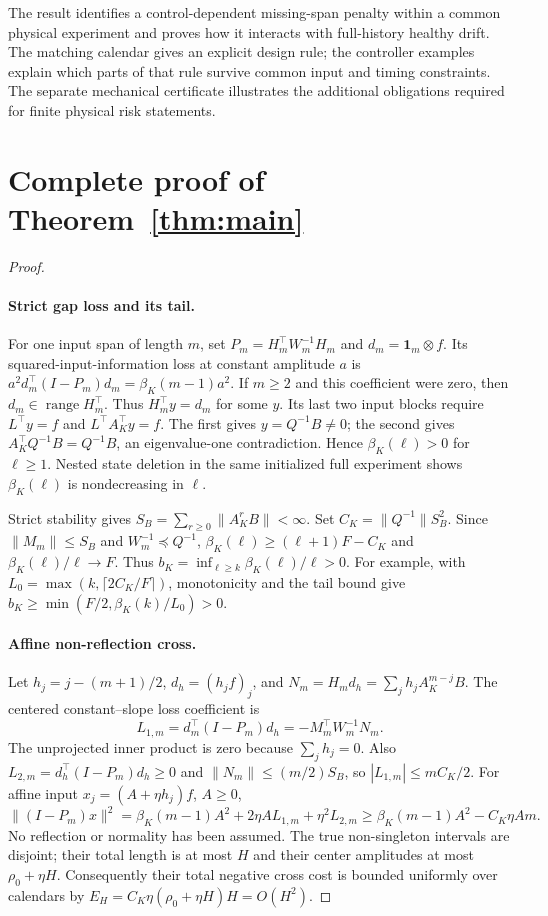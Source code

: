 \documentclass[11pt]{article}
\begin{document}
The result identifies a control-dependent missing-span penalty within a
common physical experiment and proves how it interacts with full-history
healthy drift. The matching calendar gives an explicit design rule; the
controller examples explain which parts of that rule survive common input
and timing constraints. The separate mechanical certificate illustrates the
additional obligations required for finite physical risk statements.

\appendix
\section{Complete proof of Theorem~\ref{thm:main}}\label{sec:proof}

\begin{proof}
\paragraph{Strict gap loss and its tail.}
For one input span of length $m$, set $P_m=H_m^\top W_m^{-1}H_m$ and
$d_m=\mathbf1_m\otimes f$.
Its squared-input-information loss at constant amplitude $a$ is
$a^2d_m^\top(I-P_m)d_m=\beta_K(m-1)a^2$.
If $m\ge2$ and this coefficient were zero, then $d_m\in\operatorname{range}H_m^\top$.
Thus $H_m^\top y=d_m$ for some $y$. Its last two input blocks require
$L^\top y=f$ and $L^\top A_K^\top y=f$.
The first gives $y=Q^{-1}B\ne0$; the second gives
$A_K^\top Q^{-1}B=Q^{-1}B$, an eigenvalue-one contradiction.
Hence $\beta_K(\ell)>0$ for $\ell\ge1$.
Nested state deletion in the same initialized full experiment shows
$\beta_K(\ell)$ is nondecreasing in $\ell$.

Strict stability gives
$S_B=\sum_{r\ge0}\|A_K^rB\|<\infty$.
Set $C_K=\|Q^{-1}\|S_B^2$.
Since $\|M_m\|\le S_B$ and $W_m^{-1}\preceq Q^{-1}$,
$\beta_K(\ell)\ge(\ell+1)F-C_K$ and $\beta_K(\ell)/\ell\to F$.
Thus $b_K=\inf_{\ell\ge k}\beta_K(\ell)/\ell>0$.
For example, with $L_0=\max(k,\lceil2C_K/F\rceil)$,
monotonicity and the tail bound give
$b_K\ge\min(F/2,\beta_K(k)/L_0)>0$.

\paragraph{Affine non-reflection cross.}
Let $h_j=j-(m+1)/2$, $d_h=(h_jf)_j$, and
$N_m=H_m d_h=\sum_jh_jA_K^{m-j}B$.
The centered constant--slope loss coefficient is
\[
L_{1,m}=d_m^\top(I-P_m)d_h=-M_m^\top W_m^{-1}N_m .
\]
The unprojected inner product is zero because $\sum_jh_j=0$.
Also $L_{2,m}=d_h^\top(I-P_m)d_h\ge0$ and
$\|N_m\|\le(m/2)S_B$, so $|L_{1,m}|\le mC_K/2$.
For affine input $x_j=(A+\eta h_j)f$, $A\ge0$,
\begin{equation}\label{eq:affine}
\| (I-P_m)x\|^2
=\beta_K(m-1)A^2+2\eta A L_{1,m}+\eta^2L_{2,m}
\ge\beta_K(m-1)A^2-C_K\eta A m .
\end{equation}
No reflection or normality has been assumed.
The true non-singleton intervals are disjoint; their total length is at most
$H$ and their center amplitudes at most $\rho_0+\eta H$.
Consequently their total negative cross cost is bounded uniformly over
calendars by $E_H=C_K\eta(\rho_0+\eta H)H=O(H^2)$.


\end{proof}
\end{document}
